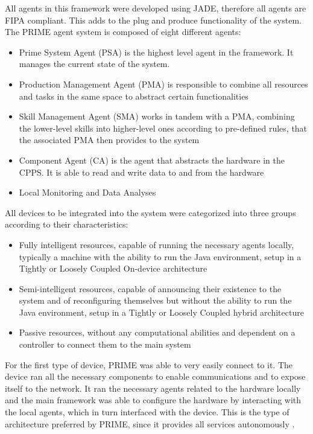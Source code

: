 All agents in this framework were developed using JADE, therefore all agents are FIPA compliant. This adds to the plug and produce functionality of the system. The PRIME agent system is composed of eight different agents:
\begin{itemize}
	\item Prime System Agent (PSA) is the highest level agent in the framework. It manages the current state of the system.
	\item Production Management Agent (PMA) is responsible to combine all resources and tasks in the same space to abstract certain functionalities
	\item Skill Management Agent (SMA) works in tandem with a PMA, combining the lower-level skills into higher-level ones according to pre-defined rules, that the associated PMA then provides to the system
	\item Component Agent (CA) is the agent that abstracts the hardware in the CPPS. It is able to read and write data to and from the hardware
	\item Local Monitoring and Data Analyses
\end{itemize}

All devices to be integrated into the system were categorized into three groups according to their characteristics:
\begin{itemize}
	\item Fully intelligent resources, capable of running the necessary agents locally, typically a machine with the ability to run the Java environment, setup in a Tightly or Loosely Coupled On-device architecture
	\item Semi-intelligent resources, capable of announcing their existence to the system and of reconfiguring themselves but without the ability to run the Java environment, setup in a Tightly or Loosely Coupled hybrid architecture
	\item Passive resources, without any computational abilities and dependent on a controller to connect them to the main system  
\end{itemize}

For the first type of device, PRIME was able to very easily connect to it. The device ran all the necessary components to enable communications and to expose itself to the network. It ran the necessary agents related to the hardware locally and the main framework was able to configure the hardware by interacting with the local agents, which in turn interfaced with the device. This is the type of architecture preferred by PRIME, since it provides all services autonomously \cite{PRIME_plug_and_produce}.\\

